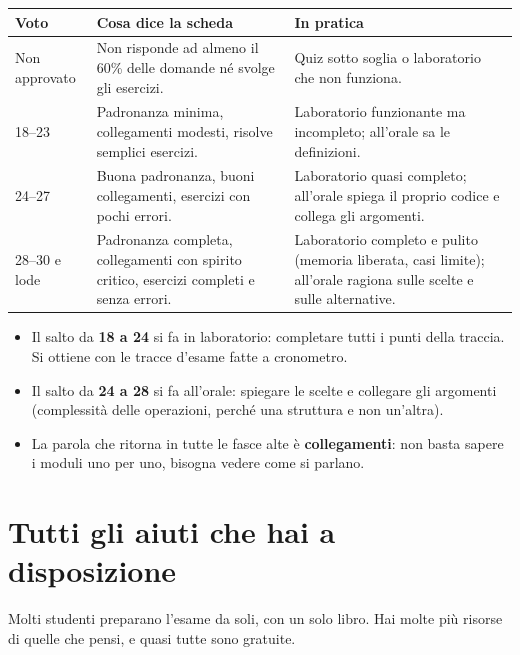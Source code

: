 \begin{center}\small
\begin{tabular}{lp{6cm}p{5.4cm}}
\toprule
\textbf{Voto} & \textbf{Cosa dice la scheda} & \textbf{In pratica} \\
\midrule
Non approvato & Non risponde ad almeno il 60\% delle domande né svolge gli esercizi. &
Quiz sotto soglia o laboratorio che non funziona. \\
18--23 & Padronanza minima, collegamenti modesti, risolve semplici esercizi. &
Laboratorio funzionante ma incompleto; all'orale sa le definizioni. \\
24--27 & Buona padronanza, buoni collegamenti, esercizi con pochi errori. &
Laboratorio quasi completo; all'orale spiega il proprio codice e collega gli
argomenti. \\
28--30 e lode & Padronanza completa, collegamenti con spirito critico, esercizi
completi e senza errori. &
Laboratorio completo e pulito (memoria liberata, casi limite); all'orale ragiona sulle
scelte e sulle alternative. \\
\bottomrule
\end{tabular}
\end{center}

\begin{consiglio}
\begin{itemize}
  \item Il salto da \textbf{18 a 24} si fa in laboratorio: completare tutti i punti
        della traccia. Si ottiene con le tracce d'esame fatte a cronometro.
  \item Il salto da \textbf{24 a 28} si fa all'orale: spiegare le scelte e collegare gli
        argomenti (complessità delle operazioni, perché una struttura e non un'altra).
  \item La parola che ritorna in tutte le fasce alte è \textbf{collegamenti}: non basta
        sapere i moduli uno per uno, bisogna vedere come si parlano.
\end{itemize}
\end{consiglio}

\section{Tutti gli aiuti che hai a disposizione}

Molti studenti preparano l'esame da soli, con un solo libro. Hai molte più risorse di
quelle che pensi, e quasi tutte sono gratuite.


